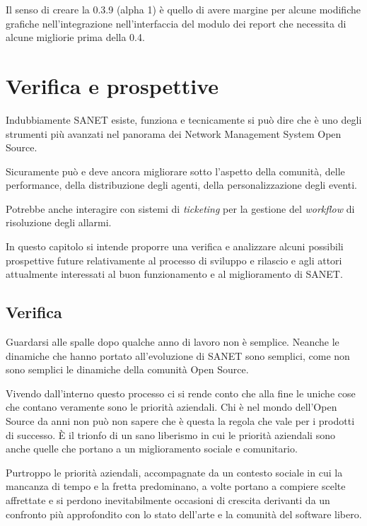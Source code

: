 \documentclass[a4wide,10pt,italian]{manual}
\begin{document}
Il senso di creare la 0.3.9 (alpha 1) è quello di avere margine per alcune modifiche grafiche
nell'integrazione nell'interfaccia del modulo dei report che necessita di alcune migliorie prima della 0.4.

\resetcurrentobjects
\hypertarget{--doc-retrospectiveandfuture}{}

\hypertarget{retrospective-and-future}{}\chapter{Verifica e prospettive}

Indubbiamente SANET esiste, funziona e tecnicamente si può dire che è
uno degli strumenti più avanzati nel panorama dei Network Management System
Open Source.

Sicuramente può e deve ancora migliorare sotto l'aspetto della comunità,
delle performance, della distribuzione degli agenti, della personalizzazione
degli eventi.

Potrebbe anche interagire con sistemi di \emph{ticketing} per la gestione
del \emph{workflow} di risoluzione degli allarmi.

In questo capitolo si intende proporre una verifica
e analizzare alcuni possibili prospettive future
relativamente al processo di sviluppo e rilascio e agli attori
attualmente interessati al buon funzionamento e al miglioramento di SANET.


\section{Verifica}

Guardarsi alle spalle dopo qualche anno di lavoro non è semplice.
Neanche le dinamiche che hanno portato all'evoluzione di SANET sono semplici,
come non sono semplici le dinamiche della comunità Open Source.

Vivendo dall'interno questo processo ci si rende conto che alla fine
le uniche cose che contano veramente sono le priorità aziendali.
Chi è nel mondo dell'Open Source da anni non può non sapere che è questa
la regola che vale per i prodotti di successo. È il trionfo di un sano liberismo
in cui le priorità aziendali sono anche quelle che portano a un miglioramento sociale
e comunitario.

Purtroppo le priorità aziendali, accompagnate da un contesto sociale in cui la
mancanza di tempo e la fretta predominano, a volte portano a compiere scelte
affrettate e si perdono inevitabilmente occasioni di crescita derivanti da un confronto
più approfondito con lo stato dell'arte e la comunità del software libero.
\end{document}
